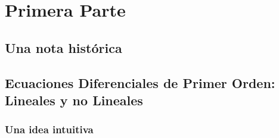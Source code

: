 \documentclass[11pt,fleqn]{book} %
\begin{document}





\tableofcontents %




\part{Primera Parte}



\chapter{Una nota histórica}


\chapter{Ecuaciones Diferenciales de Primer Orden:
        Lineales y no Lineales}

\section{Una idea intuitiva}
\end{document}
